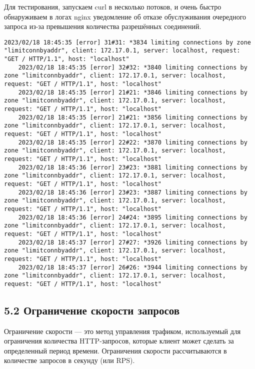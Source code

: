 Для тестирования, запускаем curl в несколько потоков, и очень быстро обнаруживаем в логах nginx уведомление об отказе обуслуживания очередного запроса из-за превышения количества разрешённых соединений.
\begin{Verbatim}[frame=single,breaklines=true,breakanywhere=true]
    2023/02/18 18:45:35 [error] 31#31: *3834 limiting connections by zone "limitconnbyaddr", client: 172.17.0.1, server: localhost, request: "GET / HTTP/1.1", host: "localhost"
    2023/02/18 18:45:35 [error] 32#32: *3840 limiting connections by zone "limitconnbyaddr", client: 172.17.0.1, server: localhost, request: "GET / HTTP/1.1", host: "localhost"
    2023/02/18 18:45:35 [error] 21#21: *3846 limiting connections by zone "limitconnbyaddr", client: 172.17.0.1, server: localhost, request: "GET / HTTP/1.1", host: "localhost"
    2023/02/18 18:45:35 [error] 21#21: *3856 limiting connections by zone "limitconnbyaddr", client: 172.17.0.1, server: localhost, request: "GET / HTTP/1.1", host: "localhost"
    2023/02/18 18:45:35 [error] 22#22: *3870 limiting connections by zone "limitconnbyaddr", client: 172.17.0.1, server: localhost, request: "GET / HTTP/1.1", host: "localhost"
    2023/02/18 18:45:36 [error] 23#23: *3881 limiting connections by zone "limitconnbyaddr", client: 172.17.0.1, server: localhost, request: "GET / HTTP/1.1", host: "localhost"
    2023/02/18 18:45:36 [error] 23#23: *3887 limiting connections by zone "limitconnbyaddr", client: 172.17.0.1, server: localhost, request: "GET / HTTP/1.1", host: "localhost"
    2023/02/18 18:45:36 [error] 24#24: *3895 limiting connections by zone "limitconnbyaddr", client: 172.17.0.1, server: localhost, request: "GET / HTTP/1.1", host: "localhost"
    2023/02/18 18:45:37 [error] 27#27: *3926 limiting connections by zone "limitconnbyaddr", client: 172.17.0.1, server: localhost, request: "GET / HTTP/1.1", host: "localhost"
    2023/02/18 18:45:37 [error] 26#26: *3944 limiting connections by zone "limitconnbyaddr", client: 172.17.0.1, server: localhost, request: "GET / HTTP/1.1", host: "localhost"
\end{Verbatim}

\subsection*{5.2 Ограничение скорости запросов}

Ограничение скорости — это метод управления трафиком, используемый для ограничения количества HTTP-запросов, которые клиент может сделать за определенный период времени. Ограничения скорости рассчитываются в количестве запросов в секунду (или RPS).

